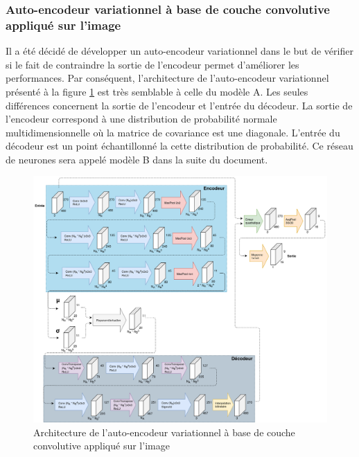 \subsubsection{Auto-encodeur variationnel à base de couche convolutive appliqué sur l'image}
    Il a été décidé de développer un auto-encodeur variationnel dans le but de vérifier si le fait de contraindre la sortie de l'encodeur permet d'améliorer les performances. Par conséquent, l'architecture de l'auto-encodeur variationnel présenté à la figure \ref{fig:architecture_cnn_vae} est très semblable à celle du modèle A. Les seules différences concernent la sortie de l'encodeur et l'entrée du décodeur. La sortie de l'encodeur correspond à une distribution de probabilité normale multidimensionnelle où la matrice de covariance est une diagonale. L'entrée du décodeur est un point échantillonné la cette distribution de probabilité. Ce réseau de neurones sera appelé modèle B dans la suite du document.
    \begin{figure}[H]
        \centering
        \includegraphics[width=17cm]{images/Architecture_CnnVae.png}
        \caption{Architecture de l'auto-encodeur variationnel à base de couche convolutive appliqué sur l'image}
        \label{fig:architecture_cnn_vae}
    \end{figure}

